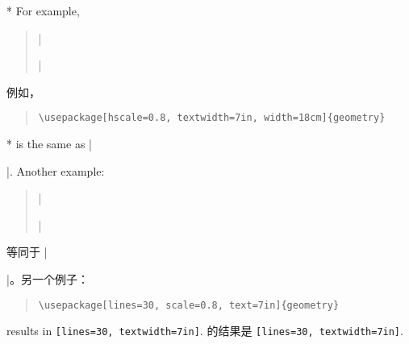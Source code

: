 \begin{paracol}{2}
 \switchcolumn[0]*
 For example, 
 \begin{quote}
  |\usepackage[hscale=0.8, textwidth=7in, width=18cm]{geometry}|
 \end{quote}
\switchcolumn
例如，
\begin{quote}
\begin{verbatim}
\usepackage[hscale=0.8, textwidth=7in, width=18cm]{geometry}
\end{verbatim}    
\end{quote}

\switchcolumn[0]*
is the same as |\usepackage[textwidth=7in]{geometry}|. Another example:
\begin{quote}
|\usepackage[lines=30, scale=0.8, text=7in]{geometry}|
\end{quote}
\switchcolumn
等同于 |\usepackage[textwidth=7in]{geometry}|。另一个例子：
\begin{quote}
\begin{verbatim}
\usepackage[lines=30, scale=0.8, text=7in]{geometry}
\end{verbatim}    
\end{quote}
\switchcolumn[0]
results in \texttt{[lines=30, textwidth=7in]}.
\switchcolumn
的结果是 \texttt{[lines=30, textwidth=7in]}.
\end{paracol}

